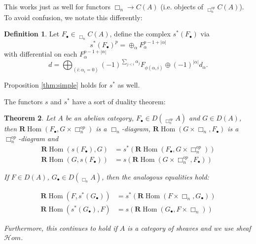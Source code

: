 \documentclass[proquest]{uwthesis}[2014/11/13]
\newtheorem{theorem}{Theorem}[section]
\theoremstyle{definition}
\newtheorem{definition}[theorem]{Definition}
\DeclareMathOperator{\Diag}{\underline{Diag}}
\DeclareMathOperator{\Hom}{Hom}
\newcommand{\cHom}{\mathcal{H} \textit{om}}
\newcommand{\bR}{\textbf{R}}
\begin{document}
This works just as well for functors $\Box_n \rightarrow C(A)$ (i.e. objects of $\Diag_{\Box_n^{op}} C(A)$).
To avoid confusion, we notate this differently:
\begin{definition}
	Let $F_\bullet \in \Diag_{\Box_n} C(A)$, define the complex $s^*(F_\bullet)$ via
	\[
		s^*(F_\bullet)^p = \oplus_\alpha F_\alpha^{p-1+|\alpha|}
	\]
	with differential on each $F_\alpha^{p-1+|\alpha|}$
	\[
		d = \bigoplus_{(i : \alpha_i = 0)} (-1)^{\sum_{j < i} \alpha_j} F_{\phi(\alpha,i)} \oplus (-1)^{|\alpha|} d_\alpha.
	\]
	
	Proposition \ref{thm:simple} holds for $s^*$ as well.
\end{definition}

The functors $s$ and $s^*$ have a sort of duality theorem:

\begin{theorem}
	\label{thm:simpleduality}
	Let $A$ be an abelian category, $F_\bullet \in D(\Diag_{\Box_n^{op}} A)$ and $G \in D(A)$, then $\bR \Hom(F_\bullet, G \times \Box_n^{op})$ is a $\Box_n$-diagram, $\bR \Hom(G \times \Box_n, F_\bullet)$ is a $\Box_n^{op}$-diagram and
	\begin{align*}
		\bR \Hom(s(F_\bullet), G) &= s^* (\bR \Hom(F_\bullet, G \times \Box_n^{op})) \\
		\bR \Hom(G, s(F_\bullet)) &= s (\bR \Hom(G \times \Box_n^{op}, F_\bullet))
	\end{align*}
	
	If $F \in D(A)$, $G_\bullet \in D(\Diag_{\Box_n} A)$, then the analogous equalities hold:
	
	\begin{align*}
		\bR \Hom(F, s^* (G_\bullet)) &= s^* (\bR \Hom(F \times \Box_n, G_\bullet)) \\
		\bR \Hom(s^*(G_\bullet), F) &= s(\bR \Hom(G_\bullet, F \times \Box_n))
	\end{align*}
	
	Furthermore, this continues to hold if $A$ is a category of sheaves and we use sheaf $\cHom$.
\end{theorem}
\end{document}
